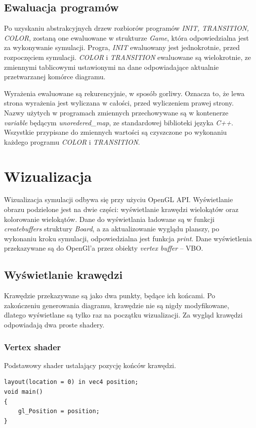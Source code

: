 \documentclass[declaration,shortabstract, inz]{iithesis}
\theoremstyle{definition} \newtheorem{definition}{Definicja}[]
\theoremstyle{plain} \newtheorem{remark}[definition]{Obserwacja}
\theoremstyle{plain} \newtheorem{theorem}[definition]{Twierdzenie}
\theoremstyle{plain} \newtheorem{example}{Przykład}[definition]
\theoremstyle{plain} \newtheorem{lemma}[definition]{Lemat}
\begin{document}
\section{Ewaluacja programów}
Po uzyskaniu abstrakcyjnych drzew rozbiorów programów \textit{INIT, TRANSITION, COLOR}, zostaną one ewaluowane w strukturze \textit{Game}, która odpowiedzialna jest za wykonywanie symulacji. Progra, \textit{INIT} ewaluowany jest jednokrotnie, przed rozpoczęciem symulacji. \textit{COLOR} i \textit{TRANSITION} ewaluowane są wielokrotnie, ze zmiennymi tablicowymi ustawionymi na dane odpowiadające aktualnie przetwarzanej komórce diagramu. 

Wyrażenia ewaluowane są rekurencyjnie, w sposób gorliwy. Oznacza to, że lewa strona wyrażenia jest wyliczana w całości, przed wyliczeniem prawej strony. Nazwy użytych w programach zmiennych przechowywane są w kontenerze \textit{variable} będącym \textit{unoredered\_map}, ze standardowej biblioteki języka \textit{C++}. Wszystkie przypisane do zmiennych wartości są czyszczone po wykonaniu każdego programu \textit{COLOR} i \textit{TRANSITION}.

\chapter{Wizualizacja}

Wizualizacja symulacji odbywa się przy użyciu OpenGL API. Wyświetlanie obrazu podzielone jest na dwie części: wyświetlanie krawędzi wielokątów oraz kolorowanie wielokątów. Dane do wyświetlania ładowane są w funkcji \textit{createbuffers} struktury \textit{Board}, a za aktualizowanie wyglądu planszy, po wykonaniu kroku symulacji, odpowiedzialna  jest funkcja \textit{print}. Dane wyświetlenia przekazywane są do OpenGl'a przez obiekty \textit{vertex buffer} -- VBO.

\section{Wyświetlanie krawędzi}

Krawędzie przekazywane są jako dwa punkty, będące ich końcami. Po zakończeniu generowania diagramu, krawędzie nie są nigdy modyfikowane, dlatego wyświetlane są tylko raz na początku wizualizacji. Za wygląd krawędzi odpowiadają dwa proste shadery. 

\subsection{Vertex shader}
Podstawowy shader ustalający pozycję końców krawędzi.
\begin{center}
\begin{lstlisting}
layout(location = 0) in vec4 position;
void main()
{
	gl_Position = position;
}
\end{lstlisting}
\end{center}
\end{document}
